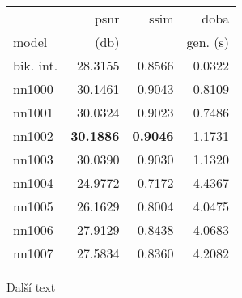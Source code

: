 			\begin{table}[hbt!]
				\centering
				\begin{tabular}{| l | r | r | r | }
					\hline
					&        psnr &      ssim &      doba  \\
					model &       (db)    &           & gen. (s) \\
					\hline
					bik. int. & 28.3155 & 0.8566 & 0.0322 \\
					nn1000    & 30.1461 & 0.9043 & 0.8109 \\
					nn1001    & 30.0324 & 0.9023 & 0.7486 \\
					nn1002    & \textbf{30.1886} & \textbf{0.9046} & 1.1731 \\
					nn1003    & 30.0390 & 0.9030 & 1.1320 \\
					nn1004    & 24.9772 & 0.7172 & 4.4367 \\
					nn1005    & 26.1629 & 0.8004 & 4.0475 \\
					nn1006    & 27.9129 & 0.8438 & 4.0683 \\
					nn1007    & 27.5834 & 0.8360 & 4.2082 \\
					\hline
				\end{tabular}
			\end{table}

			\newpage

			Další text
